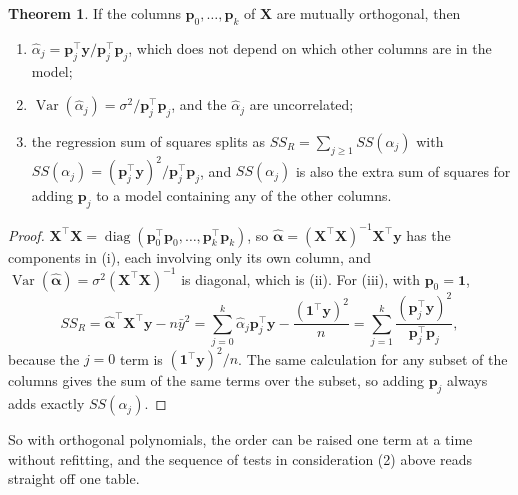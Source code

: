 \documentclass[11pt,a4paper]{article}
\numberwithin{equation}{section}
\theoremstyle{definition}
\newtheorem{thm}{Theorem}[subsection]
\begin{document}
\begin{thm}\label{thm:orthogonal-columns}
If the columns $\mathbf{p}_0, \dots, \mathbf{p}_k$ of $\mathbf{X}$ are mutually orthogonal, then
\begin{enumerate}[label=(\roman*)]
\item $\hat\alpha_j = \mathbf{p}_j^\top\mathbf{y}/\mathbf{p}_j^\top\mathbf{p}_j$, which does not depend on which other columns are in the model;
\item $\operatorname{Var}(\hat\alpha_j) = \sigma^2/\mathbf{p}_j^\top\mathbf{p}_j$, and the $\hat\alpha_j$ are uncorrelated;
\item the regression sum of squares splits as $SS_R = \sum_{j \ge 1}SS(\alpha_j)$ with
$SS(\alpha_j) = (\mathbf{p}_j^\top\mathbf{y})^2/\mathbf{p}_j^\top\mathbf{p}_j$, and $SS(\alpha_j)$ is also the extra sum of squares for adding
$\mathbf{p}_j$ to a model containing any of the other columns.
\end{enumerate}
\end{thm}

\begin{proof}
$\mathbf{X}^\top\mathbf{X} = \operatorname{diag}(\mathbf{p}_0^\top\mathbf{p}_0, \dots, \mathbf{p}_k^\top\mathbf{p}_k)$, so
$\hat{\boldsymbol\alpha} = (\mathbf{X}^\top\mathbf{X})^{-1}\mathbf{X}^\top\mathbf{y}$ has the components in (i), each involving only its own column,
and $\operatorname{Var}(\hat{\boldsymbol\alpha}) = \sigma^2(\mathbf{X}^\top\mathbf{X})^{-1}$ is diagonal, which is (ii). For (iii), with $\mathbf{p}_0 = \mathbf{1}$,
\[
SS_R = \hat{\boldsymbol\alpha}^\top\mathbf{X}^\top\mathbf{y} - n\bar y^2 = \sum_{j=0}^k \hat\alpha_j\mathbf{p}_j^\top\mathbf{y} - \frac{(\mathbf{1}^\top\mathbf{y})^2}{n}
= \sum_{j=1}^k \frac{(\mathbf{p}_j^\top\mathbf{y})^2}{\mathbf{p}_j^\top\mathbf{p}_j} ,
\]
because the $j = 0$ term is $(\mathbf{1}^\top\mathbf{y})^2/n$. The same calculation for any subset of the columns gives the sum of the
same terms over the subset, so adding $\mathbf{p}_j$ always adds exactly $SS(\alpha_j)$.
\end{proof}

So with orthogonal polynomials, the order can be raised one term at a time without refitting, and the sequence
of tests in consideration (2) above reads straight off one table.
\end{document}
